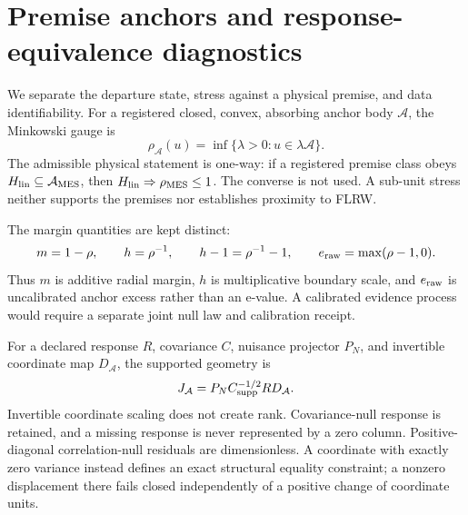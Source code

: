 
\section{Premise anchors and response-equivalence diagnostics}
\label{sec:premise-anchor-response-equivalence}

We separate the departure state, stress against a physical premise,
and data identifiability.  For a registered closed, convex, absorbing
anchor body $\mathcal A$, the Minkowski gauge is
\[
 \rho_{\mathcal A}(u)
 =\inf\{\lambda>0:u\in\lambda\mathcal A\}.
\]
The admissible physical statement is one-way: if a registered
premise class obeys
$H_{\rm lin}\subseteq\mathcal A_{\rm MES}$, then
$H_{\rm lin}\Rightarrow\rho_{\rm MES}\leq1$.
The converse is not used.  A sub-unit stress neither supports the
premises nor establishes proximity to FLRW.

The margin quantities are kept distinct:
\[
 m=1-\rho,\qquad h=\rho^{-1},\qquad
 h-1=\rho^{-1}-1,\qquad
 e_{\rm raw}=\max(\rho-1,0).
\]
Thus $m$ is additive radial margin, $h$ is multiplicative boundary
scale, and $e_{\rm raw}$ is uncalibrated anchor excess rather than an
e-value.  A calibrated evidence process would require a separate
joint null law and calibration receipt.

For a declared response $R$, covariance $C$, nuisance projector
$P_N$, and invertible coordinate map $D_{\mathcal A}$, the supported
geometry is
\[
 J_{\mathcal A}=P_N C_{\rm supp}^{-1/2}R D_{\mathcal A}.
\]
Invertible coordinate scaling does not create rank.  Covariance-null
response is retained, and a missing response is never represented by
a zero column.  Positive-diagonal correlation-null residuals are
dimensionless.  A coordinate with exactly zero variance instead
defines an exact structural equality constraint; a nonzero
displacement there fails closed independently of a positive change
of coordinate units.

